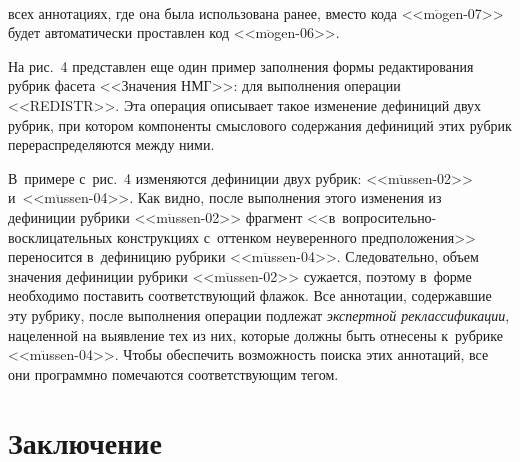 \begin{figure*} %
\vspace*{1pt}
  \begin{center}  
    \mbox{%
\epsfxsize=161.76mm
}

\end{center}
\vspace*{-6pt}
\end{figure*}

\begin{multicols}{2}

\noindent
 всех аннотациях, где 
она была использована ра\-нее, вмес\-то кода <<m$\ddot{\mbox{o}}$gen-07>> 
будет автоматически про\-став\-лен код <<m$\ddot{\mbox{o}}$gen-06>>.






  
  На рис.~4 представлен еще один пример заполнения формы 
редактирования руб\-рик фасета <<Значения НМГ>>: для выполнения 
операции \mbox{<<REDISTR>>}. Эта операция описывает такое изменение 
дефиниций двух руб\-рик, при котором компоненты смыс\-ло\-вого содержания 
дефиниций этих руб\-рик перераспределяются между ними. 

В~примере 
с~рис.~4 изменяются дефиниции двух руб\-рик: <<m$\ddot{\mbox{u}}$ssen-02>> 
и~<<m$\ddot{\mbox{u}}$ssen-04>>. Как видно, после выполнения 
этого изменения из дефиниции руб\-ри\-ки <<m$\ddot{\mbox{u}}$ssen-02>> 
фрагмент <<в~во\-про\-си\-тель\-но-вос\-кли\-ца\-тель\-ных конструкциях 
с~оттенком неуверенного предположения>> переносится в~дефиницию 
руб\-ри\-ки <<m$\ddot{\mbox{u}}$ssen-04>>. Следовательно, объем значения 
дефиниции руб\-ри\-ки <<m$\ddot{\mbox{u}}$ssen-02>> сужается, поэтому 
в~форме необходимо по\-ста\-вить соответствующий флажок. Все аннотации, 
содержавшие эту руб\-ри\-ку, после выполнения операции подлежат 
\textit{экспертной реклассификации}, нацеленной на выявление тех из них, 
которые должны быть отнесены к~рубрике <<m$\ddot{\mbox{u}}$ssen-04>>. 
Чтобы обеспечить воз\-мож\-ность поиска этих аннотаций, все они 
программно помечаются со\-от\-вет\-ст\-ву\-ющим тегом.

\vspace*{-6pt}

  
\section{Заключение}


\end{multicols}
